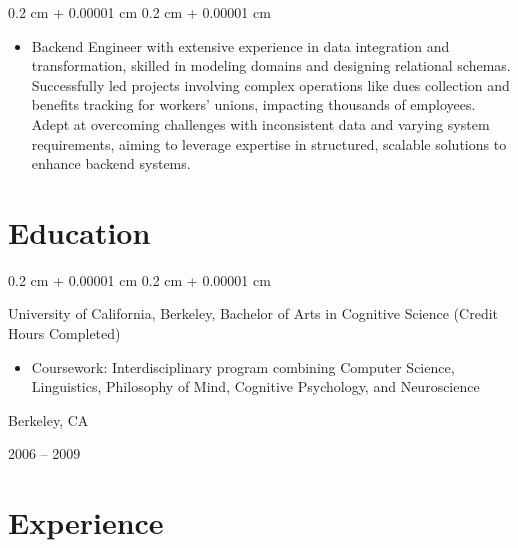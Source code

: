 \documentclass[10pt, letterpaper]{article}
\newenvironment{highlights}{
    \begin{itemize}[
        topsep=0.10 cm,
        parsep=0.10 cm,
        partopsep=0pt,
        itemsep=0pt,
        leftmargin=0.4 cm + 10pt
    ]
}{
    \end{itemize}
} %
\newenvironment{highlightsforbulletentries}{
    \begin{itemize}[
        topsep=0.10 cm,
        parsep=0.10 cm,
        partopsep=0pt,
        itemsep=0pt,
        leftmargin=10pt
    ]
}{
    \end{itemize}
} %
\newenvironment{onecolentry}{
    \begin{adjustwidth}{
        0.2 cm + 0.00001 cm
    }{
        0.2 cm + 0.00001 cm
    }
}{
    \end{adjustwidth}
} %
\newenvironment{twocolentry}[2][]{
    \onecolentry
    \def\secondColumn{#2}
    \setcolumnwidth{\fill, 4.5 cm}
    \begin{paracol}{2}
}{
    \switchcolumn \raggedleft \secondColumn
    \end{paracol}
    \endonecolentry
} %
\begin{document}
    \begin{onecolentry}
        \begin{highlightsforbulletentries}

        
            \item Backend Engineer with extensive experience in data integration and transformation, skilled in modeling domains and designing relational schemas. Successfully led projects involving complex operations like dues collection and benefits tracking for workers' unions, impacting thousands of employees. Adept at overcoming challenges with inconsistent data and varying system requirements, aiming to leverage expertise in structured, scalable solutions to enhance backend systems.
        

        \end{highlightsforbulletentries}
    \end{onecolentry}

    \section{Education}




        
            \begin{twocolentry}{
                Berkeley, CA

                2006 – 2009
            }
                University of California, Berkeley, Bachelor of Arts in Cognitive Science (Credit Hours Completed)
                \begin{highlights}
                    \item Coursework: Interdisciplinary program combining Computer Science, Linguistics, Philosophy of Mind, Cognitive Psychology, and Neuroscience
                \end{highlights}
            \end{twocolentry}
        



    \section{Experience}
\end{document}
